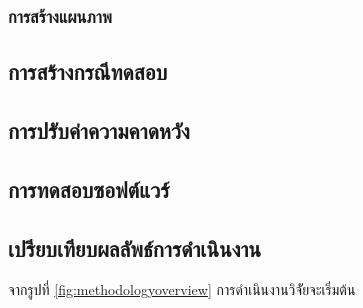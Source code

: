 \subsubsection{การสร้างแผนภาพ}

\subsection{การสร้างกรณีทดสอบ}

\subsection{การปรับค่าความคาดหวัง}

\subsection{การทดสอบซอฟต์แวร์}

\subsection{เปรียบเทียบผลลัพธ์การดำเนินงาน}

จากรูปที่ \ref{fig:methodologyoverview} การดำเนินงานวิจััยจะเริ่มต้น
